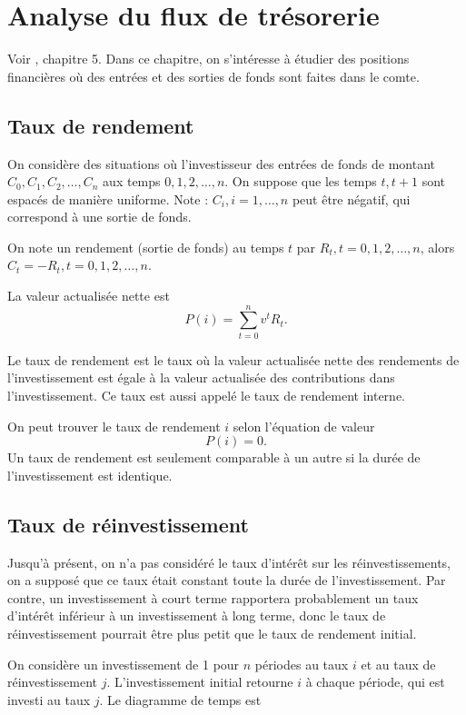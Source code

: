 \chapter{Analyse du flux de trésorerie}

Voir \cite{kellison2006theory}, chapitre 5. Dans ce chapitre, on s'intéresse à étudier des positions financières où des entrées et des sorties de fonds sont faites dans le comte. 

\section{Taux de rendement}

On considère des situations où l'investisseur des entrées de fonds de montant $C_0, C_1, C_2, \dots, C_n$ aux temps $0, 1, 2, \dots, n$. On suppose que les temps $t, t + 1$ sont espacés de manière uniforme. Note : $C_i, i = 1, \dots, n$ peut être négatif, qui correspond à une sortie de fonds. 

On note un rendement (sortie de fonds) au temps $t$ par $R_t, t = 0, 1, 2, \dots, n$, alors $C_t = -R_t, t = 0, 1, 2, \dots, n$. 

La valeur actualisée nette est
$$P(i) = \sum_{t = 0}^{n} v^tR_t.$$
\begin{definition}{}{}
	Le taux de rendement est le taux où la valeur actualisée nette des rendements de l'investissement est égale à la valeur actualisée des contributions dans l'investissement. Ce taux est aussi appelé le taux de rendement interne. 
\end{definition}
On peut trouver le taux de rendement $i$ selon l'équation de valeur $$P(i) = 0.$$
Un taux de rendement est seulement comparable à un autre si la durée de l'investissement est identique. 

\section{Taux de réinvestissement}

Jusqu'à présent, on n'a pas considéré le taux d'intérêt sur les réinvestissements, on a supposé que ce taux était constant toute la durée de l'investissement. Par contre, un investissement à court terme rapportera probablement un taux d'intérêt inférieur à un investissement à long terme, donc le taux de réinvestissement pourrait être plus petit que le taux de rendement initial. 

On considère un investissement de 1 pour $n$ périodes au taux $i$ et au taux de réinvestissement $j$. L'investissement initial retourne $i$ à chaque période, qui est investi au taux $j$. Le diagramme de temps est

